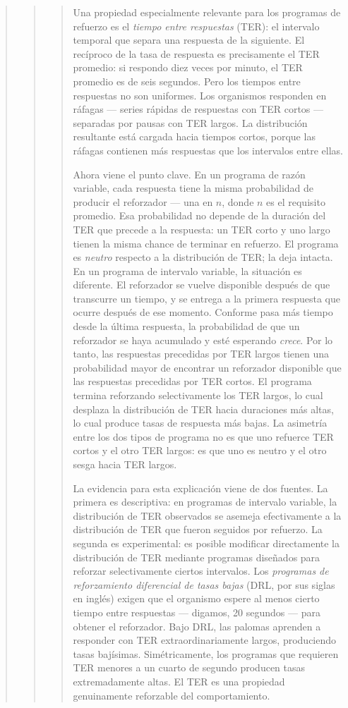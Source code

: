 \documentclass[
  letterpaper,
  DIV=11,
  numbers=noendperiod]{scrreprt}
\begin{document}
\begin{tcolorbox}[enhanced jigsaw, arc=.35mm, bottomrule=.15mm, breakable, colback=white, colframe=quarto-callout-note-color-frame, left=2mm, leftrule=.75mm, opacityback=0, rightrule=.15mm, toprule=.15mm]
\begin{quote}
\begin{quote}
\begin{quote}
Una propiedad especialmente relevante para los programas de refuerzo es
el \emph{tiempo entre respuestas} (TER): el intervalo temporal que
separa una respuesta de la siguiente. El recíproco de la tasa de
respuesta es precisamente el TER promedio: si respondo diez veces por
minuto, el TER promedio es de seis segundos. Pero los tiempos entre
respuestas no son uniformes. Los organismos responden en ráfagas ---
series rápidas de respuestas con TER cortos --- separadas por pausas con
TER largos. La distribución resultante está cargada hacia tiempos
cortos, porque las ráfagas contienen más respuestas que los intervalos
entre ellas.

Ahora viene el punto clave. En un programa de razón variable, cada
respuesta tiene la misma probabilidad de producir el reforzador --- una
en \(n\), donde \(n\) es el requisito promedio. Esa probabilidad no
depende de la duración del TER que precede a la respuesta: un TER corto
y uno largo tienen la misma chance de terminar en refuerzo. El programa
es \emph{neutro} respecto a la distribución de TER; la deja intacta. En
un programa de intervalo variable, la situación es diferente. El
reforzador se vuelve disponible después de que transcurre un tiempo, y
se entrega a la primera respuesta que ocurre después de ese momento.
Conforme pasa más tiempo desde la última respuesta, la probabilidad de
que un reforzador se haya acumulado y esté esperando \emph{crece}. Por
lo tanto, las respuestas precedidas por TER largos tienen una
probabilidad mayor de encontrar un reforzador disponible que las
respuestas precedidas por TER cortos. El programa termina reforzando
selectivamente los TER largos, lo cual desplaza la distribución de TER
hacia duraciones más altas, lo cual produce tasas de respuesta más
bajas. La asimetría entre los dos tipos de programa no es que uno
refuerce TER cortos y el otro TER largos: es que uno es neutro y el otro
sesga hacia TER largos.

La evidencia para esta explicación viene de dos fuentes. La primera es
descriptiva: en programas de intervalo variable, la distribución de TER
observados se asemeja efectivamente a la distribución de TER que fueron
seguidos por refuerzo. La segunda es experimental: es posible modificar
directamente la distribución de TER mediante programas diseñados para
reforzar selectivamente ciertos intervalos. Los \emph{programas de
reforzamiento diferencial de tasas bajas} (DRL, por sus siglas en
inglés) exigen que el organismo espere al menos cierto tiempo entre
respuestas --- digamos, 20 segundos --- para obtener el reforzador. Bajo
DRL, las palomas aprenden a responder con TER extraordinariamente
largos, produciendo tasas bajísimas. Simétricamente, los programas que
requieren TER menores a un cuarto de segundo producen tasas
extremadamente altas. El TER es una propiedad genuinamente reforzable
del comportamiento.


\end{quote}
\end{quote}
\end{quote}
\end{tcolorbox}
\end{document}
